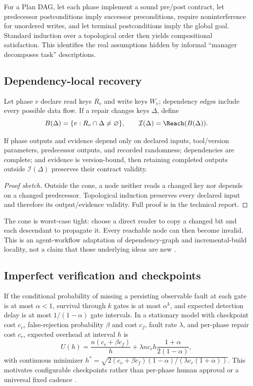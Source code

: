 \documentclass{article}
\begin{document}
For a Plan DAG, let each phase implement a sound pre/post contract, let predecessor postconditions imply successor preconditions, require noninterference for unordered writes, and let terminal postconditions imply the global goal. Standard induction over a topological order then yields compositional satisfaction. This identifies the real assumptions hidden by informal ``manager decomposes task'' descriptions.

\subsection{Dependency-local recovery}
Let phase $v$ declare read keys $R_v$ and write keys $W_v$; dependency edges include every possible data flow. If a repair changes keys $\Delta$, define
\[
B(\Delta)=\{v:R_v\cap\Delta\ne\varnothing\},\qquad
\mathcal I(\Delta)=\Reach(B(\Delta)).
\]
\begin{theorem}
If phase outputs and evidence depend only on declared inputs, tool/version parameters, predecessor outputs, and recorded randomness; dependencies are complete; and evidence is version-bound, then retaining completed outputs outside $\mathcal I(\Delta)$ preserves their contract validity.
\end{theorem}
\begin{proof}[Proof sketch]
Outside the cone, a node neither reads a changed key nor depends on a changed predecessor. Topological induction preserves every declared input and therefore its output/evidence validity. Full proof is in the technical report.
\end{proof}
The cone is worst-case tight: choose a direct reader to copy a changed bit and each descendant to propagate it. Every reachable node can then become invalid. This is an agent-workflow adaptation of dependency-graph and incremental-build locality, not a claim that those underlying ideas are new \citep{mokhov2018build}.

\subsection{Imperfect verification and checkpoints}
If the conditional probability of missing a persisting observable fault at each gate is at most $\alpha<1$, survival through $k$ gates is at most $\alpha^k$, and expected detection delay is at most $1/(1-\alpha)$ gate intervals. In a stationary model with checkpoint cost $c_v$, false-rejection probability $\beta$ and cost $c_f$, fault rate $\lambda$, and per-phase repair cost $c_r$, expected overhead at interval $h$ is
\[
U(h)=\frac{n(c_v+\beta c_f)}h+\lambda n c_r h\frac{1+\alpha}{2(1-\alpha)},
\]
with continuous minimizer
$h^*=\sqrt{2(c_v+\beta c_f)(1-\alpha)/(\lambda c_r(1+\alpha))}$.
This motivates configurable checkpoints rather than per-phase human approval or a universal fixed cadence \citep{young1974first,daly2006higher}.
\end{document}
